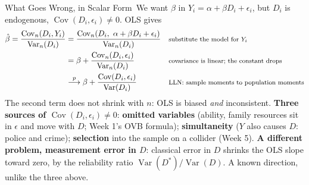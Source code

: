 \documentclass[aspectratio=169,11pt,xcolor=dvipsnames]{beamer}
\DeclareMathOperator{\Cov}{Cov}
\DeclareMathOperator{\Var}{Var}
\newcommand{\pto}{\overset{p}{\longrightarrow}}
\newcommand{\core}{\,\raisebox{0.6pt}{\textcolor{corestar}{$\bigstar$}}}
\begin{document}
\begin{frame}{What Goes Wrong, in Scalar Form\core}
We want $\beta$ in $Y_i = \alpha + \beta D_i + \epsilon_i$, but $D_i$ is
\alert{endogenous}, $\Cov(D_i,\epsilon_i)\neq 0$. OLS gives
\vskip-6pt
\begin{align*}
  \hat\beta = \frac{\Cov_n(D_i, Y_i)}{\Var_n(D_i)}
     &= \frac{\Cov_n(D_i,\ \alpha + \beta D_i + \epsilon_i)}{\Var_n(D_i)}
     && \text{\footnotesize substitute the model for $Y_i$} \\
     &= \beta + \frac{\Cov_n(D_i,\epsilon_i)}{\Var_n(D_i)}
     && \text{\footnotesize covariance is linear; the constant drops} \\
     &\pto \beta + \frac{\Cov(D_i,\epsilon_i)}{\Var(D_i)}
     && \text{\footnotesize LLN: sample moments to population moments}
\end{align*}
\vskip-5pt
The second term does not shrink with $n$: OLS is biased \emph{and} inconsistent.
\vskip0pt
\textbf{Three sources of $\Cov(D_i,\epsilon_i) \neq 0$}: \textbf{omitted variables}
(ability, family resources sit in $\epsilon$ and move with $D$; Week 1's OVB
formula); \textbf{simultaneity} ($Y$ also causes $D$: police and crime);
\textbf{selection} into the sample on a collider (Week 5).
\vskip1pt
\textbf{A different problem, measurement error in $D$}: classical error in $D$
shrinks the OLS slope toward zero, by the reliability ratio $\Var(D^*)/\Var(D)$.
A known direction, unlike the three above.
\end{frame}
\end{document}
